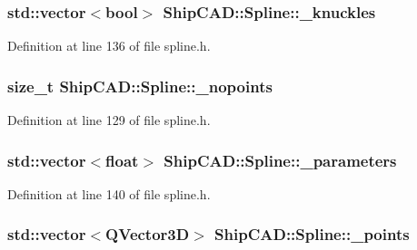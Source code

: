 \hypertarget{classShipCAD_1_1Spline_ac7d024ce90642d78587bc921efde009c}{
\subsubsection[{\-\_\-knuckles}]{\setlength{\rightskip}{0pt plus 5cm}std\-::vector$<$bool$>$ Ship\-C\-A\-D\-::\-Spline\-::\-\_\-knuckles\hspace{0.3cm}{\ttfamily [protected]}}}\label{classShipCAD_1_1Spline_ac7d024ce90642d78587bc921efde009c}


Definition at line 136 of file spline.\-h.

\hypertarget{classShipCAD_1_1Spline_a94ae8704ab2cae5ba6bb915e3df2e98d}{
\subsubsection[{\-\_\-nopoints}]{\setlength{\rightskip}{0pt plus 5cm}size\-\_\-t Ship\-C\-A\-D\-::\-Spline\-::\-\_\-nopoints\hspace{0.3cm}{\ttfamily [protected]}}}\label{classShipCAD_1_1Spline_a94ae8704ab2cae5ba6bb915e3df2e98d}


Definition at line 129 of file spline.\-h.

\hypertarget{classShipCAD_1_1Spline_a374180992c17d3ee4b869d45080529fc}{
\subsubsection[{\-\_\-parameters}]{\setlength{\rightskip}{0pt plus 5cm}std\-::vector$<$float$>$ Ship\-C\-A\-D\-::\-Spline\-::\-\_\-parameters\hspace{0.3cm}{\ttfamily [protected]}}}\label{classShipCAD_1_1Spline_a374180992c17d3ee4b869d45080529fc}


Definition at line 140 of file spline.\-h.

\hypertarget{classShipCAD_1_1Spline_a6288af72f907a160974b7ce5207316ec}{
\subsubsection[{\-\_\-points}]{\setlength{\rightskip}{0pt plus 5cm}std\-::vector$<$Q\-Vector3\-D$>$ Ship\-C\-A\-D\-::\-Spline\-::\-\_\-points\hspace{0.3cm}{\ttfamily [protected]}}}\label{classShipCAD_1_1Spline_a6288af72f907a160974b7ce5207316ec}


